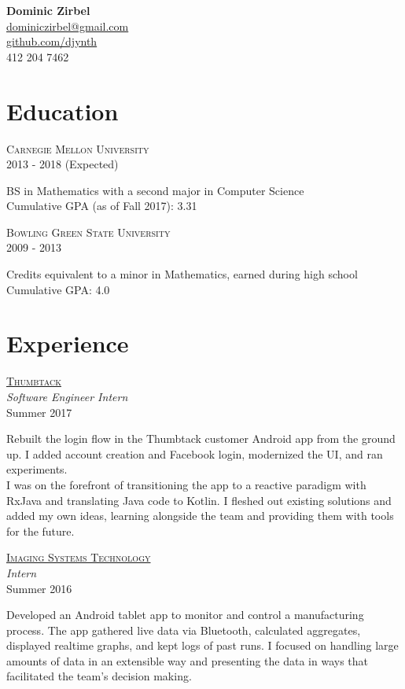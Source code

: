 \documentclass[letterpaper,10pt]{article}
\newcommand{\lb}{\vspace{4pt} \\}
\newenvironment{resumecols2}[2]
{
    \vspace{.1cm}
    \begin{minipage}[t]{.21\linewidth}
        \begin{flushright}
            \textsc{#1} \\
            \small{#2}
        \end{flushright}
    \end{minipage}
    \hspace{.005\linewidth}
    \begin{minipage}[t]{.77\linewidth}
}
{
    \end{minipage}
    \vspace{.1cm}
}
\newenvironment{resumecols}[4]
{
    \vspace{.1cm}
    \begin{minipage}[t]{.21\linewidth}
        \begin{flushright}
            \href{#2}{\textsc{#1}} \\
            \small{\textit{#3}} \\
            \small{#4}
        \end{flushright}
    \end{minipage}
    \hspace{.005\linewidth}
    \begin{minipage}[t]{.77\linewidth}
}
{
    \end{minipage}
    \vspace{.1cm}
}
\begin{document}
\thispagestyle{empty}

\begin{flushright}
    \textbf{\Large{Dominic Zirbel}} \\
    \href{mailto:dominiczirbel@gmail.com}{dominiczirbel@gmail.com} \\
    \href{https://github.com/djynth}{github.com/djynth} \\
    412 204 7462
\end{flushright}

\section{Education}

\begin{resumecols2}{Carnegie Mellon University}{2013 - 2018 (Expected)}
    BS in Mathematics with a second major in Computer Science
    \lb
    Cumulative GPA (as of Fall 2017): 3.31
\end{resumecols2}

\begin{resumecols2}{Bowling Green State University}{2009 - 2013}
    Credits equivalent to a minor in Mathematics, earned during high school
    \lb
    Cumulative GPA: 4.0
\end{resumecols2}

\section{Experience}

\begin{resumecols}{Thumbtack}{https://www.thumbtack.com/about}{Software Engineer Intern}{Summer 2017}
    Rebuilt the login flow in the Thumbtack customer Android app from the ground up. I added account creation and Facebook login, modernized the UI, and ran experiments.
    \lb
    I was on the forefront of transitioning the app to a reactive paradigm with RxJava and translating Java code to Kotlin. I fleshed out existing solutions and added my own ideas, learning alongside the team and providing them with tools for the future.
\end{resumecols}

\begin{resumecols}{Imaging Systems Technology}{http://www.teamist.com}{Intern}{Summer 2016}
    Developed an Android tablet app to monitor and control a manufacturing process. The app gathered live data via Bluetooth, calculated aggregates, displayed realtime graphs, and kept logs of past runs. I focused on handling large amounts of data in an extensible way and presenting the data in ways that facilitated the team's decision making.
\end{resumecols}
\end{document}
